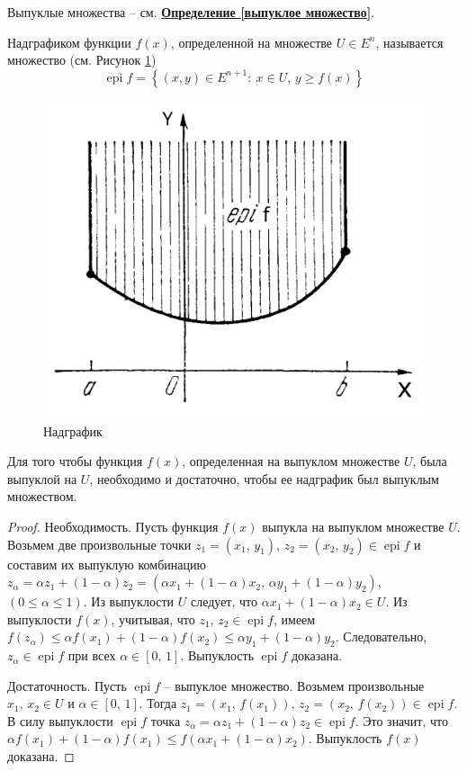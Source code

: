 
Выпуклые множества -- см. \textbf{\hyperref[выпуклое множество]{Определение \ref{выпуклое множество}}}.

\begin{multicols}{2}
\begin{definition}
	Надграфиком функции $f(x)$, определенной на множестве $U\in E^n$, называется множество (см. Рисунок \ref{fig:teor9})
	\begin{equation*}
		\operatorname{epi} f = \left\{ (x,y)\in E^{n+1}:\: x\in U,\,y\geq f(x) \right\}
	\end{equation*}
	\columnbreak
	\begin{figure}[H]
	\centering
	\includegraphics[width=.6\linewidth]{img/teor9}
	\caption{Надграфик}
	\label{fig:teor9}
	\end{figure}
\end{definition}
\end{multicols}

\begin{theorem}
	Для того чтобы функция $f(x)$, определенная на выпуклом множестве $U$, была выпуклой на $U$, необходимо и достаточно, чтобы ее надграфик был выпуклым множеством.
	\begin{proof}
		Необходимость. Пусть функция $f(x)$ выпукла на выпуклом множестве $U$. Возьмем две произвольные точки $z_1=(x_1,\,y_1),\,z_2=(x_2,\,y_2)\in \operatorname{epi} f$ и составим их выпуклую комбинацию $z_\alpha = \alpha z_1 + (1-\alpha)z_2 = (\alpha x_1 + (1-\alpha)x_2,\,\alpha y_1 + (1-\alpha)y_2)$, $(0\leq\alpha\leq1)$. Из выпуклости $U$ следует, что $\alpha x_1 + (1-\alpha)x_2 \in U$. Из выпуклости $f(x)$, учитывая, что $z_1,\,z_2\in\operatorname{epi}f$, имеем $f(z_\alpha) \leq \alpha f(x_1)+(1-\alpha)f(x_2)\leq\alpha y_1 + (1-\alpha)y_2$. Следовательно, $z_\alpha\in\operatorname{epi}f$ при всех $\alpha\in \left[0,\,1\right]$. Выпуклость $\operatorname{epi}f$ доказана.
		
		Достаточность. Пусть $\operatorname{epi}f$ -- выпуклое множество. Возьмем произвольные $x_1,\,x_2\in U$ и $\alpha\in\left[0,\,1\right]$. Тогда $z_1=(x_1,\,f(x_1)),\,z_2=(x_2,\,f(x_2))\in\operatorname{epi}f$. В силу выпуклости $\operatorname{epi}f$ точка $z_\alpha=\alpha z_1 + (1-\alpha)z_2\in\operatorname{epi}f$. Это значит, что $\alpha f(x_1) + (1-\alpha)f(x_1) \leq f\left(\alpha x_1 + (1-\alpha)x_2\right)$. Выпуклость $f(x)$ доказана.
	\end{proof}
\end{theorem}

